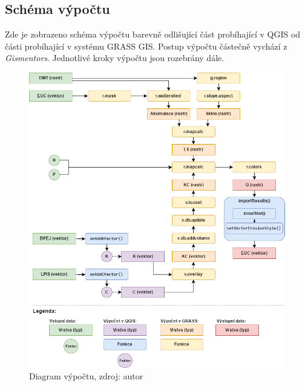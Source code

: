\subsection{Schéma výpočtu} Zde je zobrazeno schéma výpočtu barevně
odlišující část probíhající v QGIS od části probíhající v systému
GRASS GIS. Postup výpočtu částečně vychází z
\textit{Gismentors}\cite{gismentors}. Jednotlivé kroky výpočtu jsou
rozebrány dále.
\begin{figure}[H]
\centering \includegraphics[scale=0.6]{./pictures/diagram.png}
      \caption[Diagram výpočtu] {Diagram výpočtu, zdroj: autor}
      \label{diagram}
\end{figure}
\newpage
